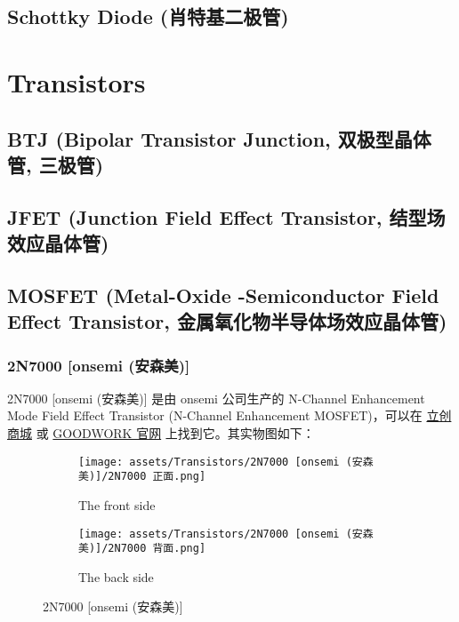 \documentclass[UTF8]{report}
\begin{document}
\section{Schottky Diode (肖特基二极管)}

\chapter{Transistors}\thispagestyle{fancy}
\section{BTJ (Bipolar Transistor Junction, 双极型晶体管, 三极管)}
\section{JFET (Junction Field Effect Transistor, 结型场效应晶体管)}
\section{MOSFET (Metal-Oxide -Semiconductor Field Effect Transistor, 金属氧化物半导体场效应晶体管)}


\subsection{2N7000 [onsemi (安森美)]}

2N7000 [onsemi (安森美)] 是由 onsemi 公司生产的 N-Channel Enhancement Mode Field Effect Transistor (N-Channel Enhancement MOSFET)，可以在 \href{https://item.szlcsc.com/232636.html}{立创商城} 或  \href{https://www.GOODWORK.com/products/discrete-power-modules/mosfets/small-signal-mosfets/1N4007}{GOODWORK 官网} 上找到它。其实物图如下：

\begin{figure}[H]\centering
    \begin{subfigure}[b]{0.5\columnwidth}\centering
        \texttt{[image: assets/Transistors/2N7000 [onsemi (安森美)]/2N7000 正面.png]}
        \caption{The front side}
    \end{subfigure}\hfill
    \begin{subfigure}[b]{0.5\columnwidth}\centering
        \texttt{[image: assets/Transistors/2N7000 [onsemi (安森美)]/2N7000 背面.png]}
        \caption{The back side}
    \end{subfigure}
    \caption{2N7000 [onsemi (安森美)]}
\end{figure}
\end{document}
